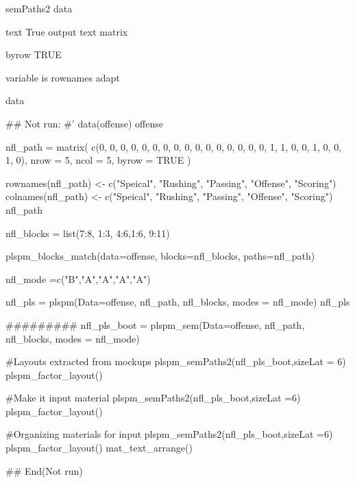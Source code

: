 \documentclass[a4paper]{book}
\begin{document}
%
\begin{Arguments}
\begin{ldescription}
\item[\code{semplot}] semPaths2 data

\item[\code{text}] text True output text matrix

\item[\code{byrow}] byrow TRUE

\item[\code{variable}] variable is rownames adapt
\end{ldescription}
\end{Arguments}
%
\begin{Value}
data
\end{Value}
%
\begin{Examples}
\begin{ExampleCode}


\#\# Not run: 
#'
data(offense)
offense %

nfl_path = matrix(
  c(0, 0, 0, 0, 0,
    0, 0, 0, 0, 0,
    0, 0, 0, 0, 0,
    0, 1, 1, 0, 0,
    1, 0, 0, 1, 0),
  nrow = 5, ncol = 5, byrow = TRUE )

rownames(nfl_path) <- c("Speical", "Rushing", "Passing", "Offense", "Scoring")
colnames(nfl_path) <- c("Speical", "Rushing", "Passing", "Offense", "Scoring")
nfl_path

nfl_blocks = list(7:8, 1:3, 4:6,1:6, 9:11)

plspm_blocks_match(data=offense, blocks=nfl_blocks,
                   paths=nfl_path)

nfl_mode =c("B","A","A","A","A")

nfl_pls = plspm(Data=offense, nfl_path, nfl_blocks, modes = nfl_mode)
nfl_pls%

#########
nfl_pls_boot = plspm_sem(Data=offense, nfl_path, nfl_blocks, modes = nfl_mode)

#Layouts extracted from mockups
plspm_semPaths2(nfl_pls_boot,sizeLat = 6)%
  plspm_factor_layout()

#Make it input material
plspm_semPaths2(nfl_pls_boot,sizeLat =6)%
  plspm_factor_layout() %

#Organizing materials for input
plspm_semPaths2(nfl_pls_boot,sizeLat =6)%
  plspm_factor_layout() %
  mat_text_arrange()

## End(Not run)

\end{ExampleCode}
\end{Examples}
\end{document}
